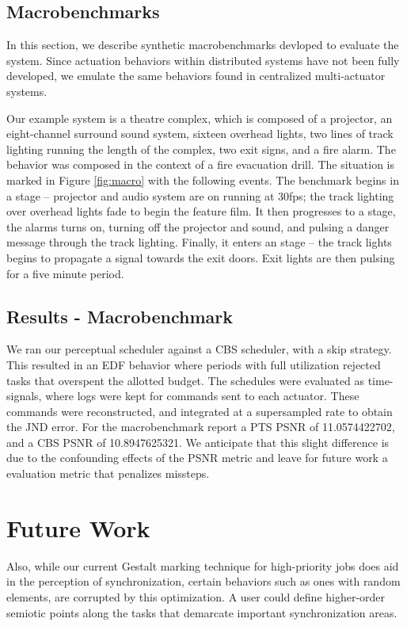 \documentclass{sigchi}
\newcommand*{\schedule}[1]{{\textbf{\small{\fontfamily{cmss}\selectfont{#1}}}}}
\begin{document}
    \subsection{Macrobenchmarks}
  In this section, we describe synthetic macrobenchmarks devloped to evaluate the system. Since actuation behaviors within distributed systems have not been fully developed, we emulate the same behaviors found in centralized multi-actuator systems. 

  Our example system is a theatre complex, which is composed of a projector, an eight-channel surround sound system, sixteen overhead lights, two lines of track lighting running the length of the complex, two exit signs, and a fire alarm. The behavior was composed in the context of a fire evacuation drill. The situation is marked in Figure \ref{fig:macro} with the following events. The benchmark begins in a \schedule{IDLE} stage – projector and audio system are on running at 30fps; the track lighting over overhead lights fade to begin the feature film. It then progresses to a \schedule{ALERT} stage, the alarms turns on, turning off the projector and sound, and pulsing a danger message through the track lighting. Finally, it enters an \schedule{EXIT} stage – the track lights begins to propagate a signal towards the exit doors. Exit lights are then pulsing for a five minute period. 


  \subsection{Results - Macrobenchmark}
  We ran our perceptual scheduler against a CBS scheduler, with a skip strategy. This resulted in an EDF behavior where periods with full utilization rejected tasks that overspent the allotted budget. The schedules were evaluated as time-signals, where logs were kept for commands sent to each actuator. These commands were reconstructed, and integrated at a supersampled rate to obtain the JND error. 
  For the macrobenchmark report a PTS PSNR of 11.0574422702, and a CBS PSNR of 10.8947625321.
  We anticipate that this slight difference is due to the confounding effects of the PSNR metric and leave for future work a evaluation metric that penalizes missteps. 


  \section{Future Work}
  Also, while our current Gestalt marking technique for high-priority jobs does aid in the perception of synchronization, certain behaviors such as ones with random elements, are corrupted by this optimization. A user could define higher-order semiotic points along the tasks that demarcate important synchronization areas. 
\end{document}
